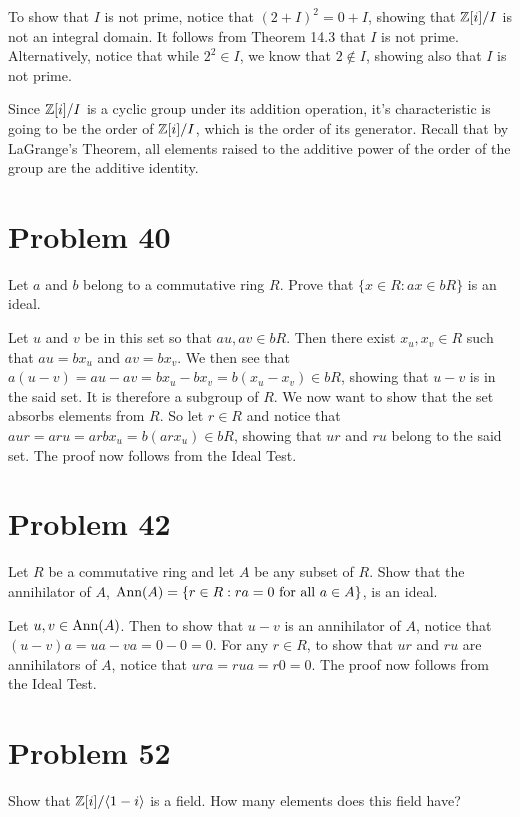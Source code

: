 \documentclass{article}
\begin{document}
To show that $I$ is not prime, notice that $(2+I)^2=0+I$, showing that $\mathbb{Z}[i]/I$
is not an integral domain.  It follows from Theorem 14.3 that $I$ is not prime.
Alternatively, notice that while
$2^2\in I$, we know that $2\not\in I$, showing also that $I$ is not prime.

Since $\mathbb{Z}[i]/I$ is a cyclic group under its addition operation,
it's characteristic is going to be the order
of $\mathbb{Z}[i]/I$, which is the order of its generator.  Recall that by LaGrange's
Theorem, all elements raised to the additive power of the order of the group
are the additive identity.

\pagebreak
\section*{Problem 40}

Let $a$ and $b$ belong to a commutative ring $R$.  Prove that $\{x\in R:ax\in bR\}$
is an ideal.

Let $u$ and $v$ be in this set so that $au,av\in bR$.  Then there exist
$x_u,x_v\in R$ such that $au=bx_u$ and $av=bx_v$.
We then see that $a(u-v)=au-av=bx_u-bx_v=b(x_u-x_v)\in bR$, showing that
$u-v$ is in the said set.  It is therefore a subgroup of $R$.
We now want to show that the set absorbs elements from $R$.
So let $r\in R$ and notice that $aur=aru=arbx_u=b(arx_u)\in bR$, showing that
$ur$ and $ru$ belong to the said set.  The proof now follows from the Ideal Test.

\section*{Problem 42}

Let $R$ be a commutative ring and let $A$ be any subset of $R$.  Show that the
annihilator of $A$, $\mbox{Ann}(A)=\{r\in R:\mbox{$ra=0$ for all $a\in A$}\}$, is an ideal.

Let $u,v\in\mbox{Ann}(A)$.  Then to show that $u-v$ is an annihilator of $A$,
notice that $(u-v)a=ua-va=0-0=0$.  For any $r\in R$,
to show that $ur$ and $ru$ are annihilators of
$A$, notice that $ura=rua=r0=0$.  The proof now follows from the Ideal Test.

\section*{Problem 52}

Show that $\mathbb{Z}[i]/\langle 1-i\rangle$ is a field.
How many elements does this field have?
\end{document}
